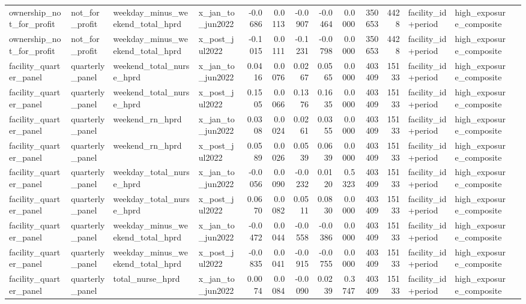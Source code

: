 \begin{tabular}{llllrrrrrrrlll}
ownership_not_for_profit & not_for_profit & weekday_minus_weekend_total_hprd & x_jan_to_jun2022 & -0.0686 & 0.0113 & -0.0907 & -0.0464 & 0.0000 & 350653 & 4428 & facility_id+period & high_exposure_composite &  \\
ownership_not_for_profit & not_for_profit & weekday_minus_weekend_total_hprd & x_post_jul2022 & -0.1015 & 0.0111 & -0.1231 & -0.0798 & 0.0000 & 350653 & 4428 & facility_id+period & high_exposure_composite &  \\
facility_quarter_panel & quarterly_panel & weekend_total_nurse_hprd & x_jan_to_jun2022 & 0.0416 & 0.0076 & 0.0267 & 0.0565 & 0.0000 & 403409 & 15133 & facility_id+period & high_exposure_composite &  \\
facility_quarter_panel & quarterly_panel & weekend_total_nurse_hprd & x_post_jul2022 & 0.1505 & 0.0066 & 0.1376 & 0.1635 & 0.0000 & 403409 & 15133 & facility_id+period & high_exposure_composite &  \\
facility_quarter_panel & quarterly_panel & weekend_rn_hprd & x_jan_to_jun2022 & 0.0308 & 0.0024 & 0.0261 & 0.0355 & 0.0000 & 403409 & 15133 & facility_id+period & high_exposure_composite &  \\
facility_quarter_panel & quarterly_panel & weekend_rn_hprd & x_post_jul2022 & 0.0589 & 0.0026 & 0.0539 & 0.0639 & 0.0000 & 403409 & 15133 & facility_id+period & high_exposure_composite &  \\
facility_quarter_panel & quarterly_panel & weekday_total_nurse_hprd & x_jan_to_jun2022 & -0.0056 & 0.0090 & -0.0232 & 0.0120 & 0.5323 & 403409 & 15133 & facility_id+period & high_exposure_composite &  \\
facility_quarter_panel & quarterly_panel & weekday_total_nurse_hprd & x_post_jul2022 & 0.0670 & 0.0082 & 0.0511 & 0.0830 & 0.0000 & 403409 & 15133 & facility_id+period & high_exposure_composite &  \\
facility_quarter_panel & quarterly_panel & weekday_minus_weekend_total_hprd & x_jan_to_jun2022 & -0.0472 & 0.0044 & -0.0558 & -0.0386 & 0.0000 & 403409 & 15133 & facility_id+period & high_exposure_composite &  \\
facility_quarter_panel & quarterly_panel & weekday_minus_weekend_total_hprd & x_post_jul2022 & -0.0835 & 0.0041 & -0.0915 & -0.0755 & 0.0000 & 403409 & 15133 & facility_id+period & high_exposure_composite &  \\
facility_quarter_panel & quarterly_panel & total_nurse_hprd & x_jan_to_jun2022 & 0.0074 & 0.0084 & -0.0090 & 0.0239 & 0.3747 & 403409 & 15133 & facility_id+period & high_exposure_composite &  \\

\end{tabular}
